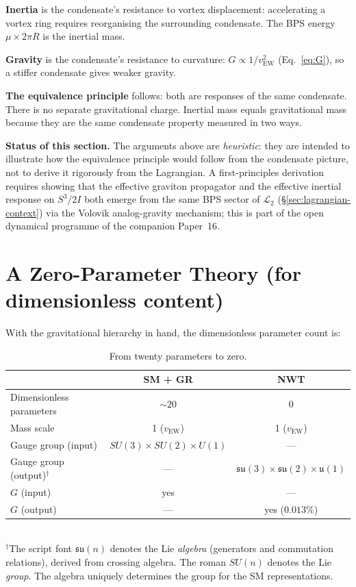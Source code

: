 \documentclass[11pt]{article}
\newcommand{\su}{\mathfrak{su}}
\begin{document}
\textbf{Inertia} is the condensate's resistance to vortex
displacement: accelerating a vortex ring requires reorganising
the surrounding condensate.  The BPS energy $\mu \times 2\pi R$
is the inertial mass.

\textbf{Gravity} is the condensate's resistance to curvature:
$G \propto 1/v_\text{EW}^2$ (Eq.~\ref{eq:G}), so a stiffer
condensate gives weaker gravity.

\textbf{The equivalence principle} follows: both are responses
of the same condensate.  There is no separate gravitational
charge.  Inertial mass equals gravitational mass because they
are the same condensate property measured in two ways.

\medskip
\noindent\textbf{Status of this section.}
The arguments above are \emph{heuristic}: they are intended to
illustrate how the equivalence principle would follow from the
condensate picture, not to derive it rigorously from the
Lagrangian.  A first-principles derivation requires showing that
the effective graviton propagator and the effective inertial
response on $S^3/2I$ both emerge from the same BPS sector of
$\mathcal{L}_2$ (\S\ref{sec:lagrangian-context}) via the Volovik
analog-gravity mechanism; this is part of the open dynamical
programme of the companion Paper~16.


\section{A Zero-Parameter Theory (for dimensionless content)}
\label{sec:zero}

With the gravitational hierarchy in hand, the dimensionless
parameter count is:

\begin{table}[h]
\centering
\caption{From twenty parameters to zero.}
\label{tab:params}
\begin{tabular}{lcc}
\toprule
 & SM + GR & NWT \\
\midrule
Dimensionless parameters & $\sim 20$ & 0 \\
Mass scale & 1 ($v_\text{EW}$) & 1 ($v_\text{EW}$) \\
Gauge group (input) & $SU(3){\times}SU(2){\times}U(1)$ & --- \\
Gauge group (output)$^\dagger$ & --- &
  $\su(3){\times}\su(2){\times}\mathfrak{u}(1)$ \\
$G$ (input) & yes & --- \\
$G$ (output) & --- & yes ($0.013\%$) \\
\bottomrule
\end{tabular}\\[4pt]
{\footnotesize $^\dagger$The script font $\su(n)$ denotes the
Lie \emph{algebra} (generators and commutation relations),
derived from crossing algebra.  The roman $SU(n)$ denotes the
Lie \emph{group}.  The algebra uniquely determines the group
for the SM representations.}
\end{table}
\end{document}
